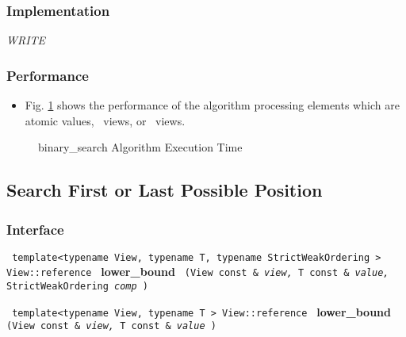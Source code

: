 \subsubsection{Implementation} %

\textit{WRITE}

\subsubsection{Performance} %

\begin{itemize}
\item
Fig. \ref{fig:bin-srch-alg-exec-exper}
shows the performance of the algorithm processing
elements which are atomic values, \stl\ views, or \stapl\ views.
\end{itemize}

\begin{figure}[p]
\caption{binary\_search Algorithm Execution Time}
\label{fig:bin-srch-alg-exec-exper}
\end{figure}


\subsection{Search First or Last Possible Position} \label{sec-sort-bound}

\subsubsection{Interface} %

\noindent
\texttt{%
template<typename View, typename T, typename StrictWeakOrdering >
\newline
View::reference 
}
\newline
\textbf{lower\_bound}%
\texttt{%
(View const \&
\textit{view,}%
T const \&
\textit{value,}%
StrictWeakOrdering 
\textit{comp}%
)
}
\vspace{0.4cm}

\noindent
\texttt{%
template<typename View, typename T >
\newline
View::reference 
}
\newline
\textbf{lower\_bound}%
\texttt{%
(View const \&
\textit{view,}%
T const \&
\textit{value}%
)
}

